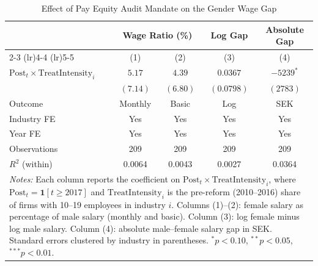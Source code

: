 \begin{table}[t]
\centering
\caption{Effect of Pay Equity Audit Mandate on the Gender Wage Gap}
\label{tab:main}
\begin{tabular}{lcccc}
\hline\hline
 & \multicolumn{2}{c}{Wage Ratio (\%)} & Log Gap & Absolute Gap \\
\cmidrule(lr){2-3} \cmidrule(lr){4-4} \cmidrule(lr){5-5}
 & (1) & (2) & (3) & (4) \\
\hline
$\text{Post}_{t} \times \text{TreatIntensity}_{i}$ & $5.17$ & $4.39$ & $0.0367$ & $-5239^{*}$ \\
 & $(7.14)$ & $(6.80)$ & $(0.0798)$ & $(2783)$ \\[6pt]
Outcome & Monthly & Basic & Log & SEK \\
Industry FE & Yes & Yes & Yes & Yes \\
Year FE & Yes & Yes & Yes & Yes \\
Observations & 209 & 209 & 209 & 209 \\
$R^2$ (within) & 0.0064 & 0.0043 & 0.0027 & 0.0364 \\
\hline\hline
\multicolumn{5}{p{0.92\textwidth}}{\footnotesize \textit{Notes:} Each column reports the coefficient on $\text{Post}_{t} \times \text{TreatIntensity}_{i}$, where $\text{Post}_{t} = \mathbf{1}[t \geq 2017]$ and $\text{TreatIntensity}_{i}$ is the pre-reform (2010--2016) share of firms with 10--19 employees in industry $i$. Columns (1)--(2): female salary as percentage of male salary (monthly and basic). Column (3): log female minus log male salary. Column (4): absolute male--female salary gap in SEK. Standard errors clustered by industry in parentheses. $^{*}p<0.10$, $^{**}p<0.05$, $^{***}p<0.01$.} \\
\end{tabular}
\end{table}
